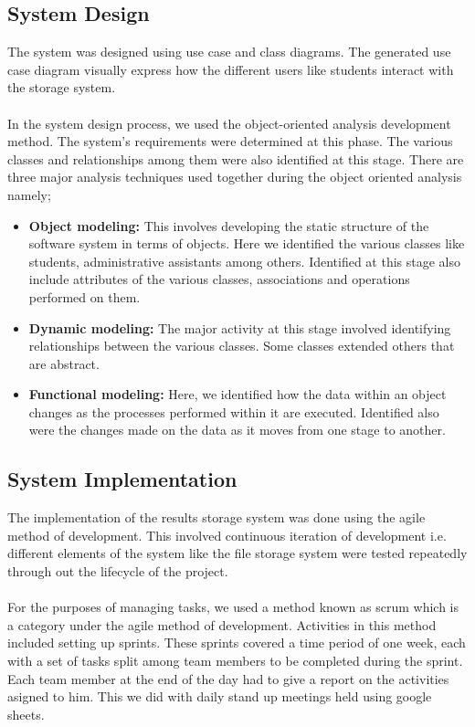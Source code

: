 \subsection{System Design}
The system was designed using use case and class diagrams. The generated use case diagram visually express how the different users like students interact with the storage system. \\~\\
In the system design process, we used the object-oriented analysis development method. The system’s requirements were determined at this phase. The various classes and relationships among them were also identified at this stage. There are three major analysis techniques used together during the object oriented analysis namely;
\begin{itemize}
\item \textbf{Object modeling:} This involves developing the static structure of the software system in terms of objects. Here we identified the various classes like students, administrative assistants among others. Identified at this stage also include attributes of the various classes, associations and operations performed on them.
\item \textbf{Dynamic modeling:} The major activity at this stage involved identifying relationships between the various classes. Some classes extended others that are abstract.  
\item \textbf{Functional modeling:} Here, we identified how the data within an object changes as the processes performed within it are executed. Identified also were the changes made on the data as it moves from one stage to another.
\end{itemize}

\subsection{System Implementation}
The implementation of the results storage system was done using the agile method of development. This involved continuous iteration  of development i.e. different elements of the system like the file storage system were tested repeatedly through out the lifecycle of the project.\\~\\
For the purposes of managing tasks, we used a method known as scrum which is a category under the agile method of development. Activities in this method included setting up sprints. These sprints covered a time period of one week, each with a set of tasks split among team members to be completed during the sprint. Each team member at the end of the day had to give a report on the activities asigned to him. This we did with daily stand up meetings held using google sheets\cite{art12}.


